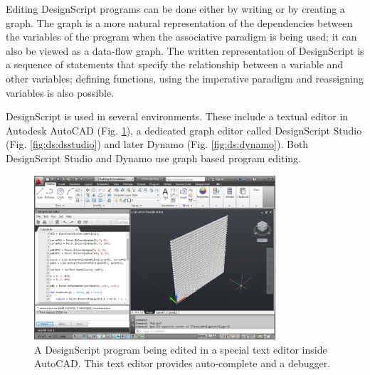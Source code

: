 \documentclass{./llncs2e/llncs}
\begin{document}
	Editing DesignScript programs can be done either by writing or by creating a graph. 
	The graph is a more natural representation of the dependencies between the variables of the program when the associative paradigm is being used; it can also be viewed as a data-flow graph. 
	The written representation of DesignScript is a sequence of statements that specify the relationship between a variable and other variables; defining functions, using the imperative paradigm and reassigning variables is also possible.
	
	DesignScript is used in several environments. 
	These include a textual editor in Autodesk AutoCAD (Fig. \ref{fig:ds:autocad}), a dedicated graph editor called DesignScript Studio (Fig. \ref{fig:ds:dsstudio}) and later Dynamo (Fig. \ref{fig:ds:dynamo}). 
	Both DesignScript Studio and Dynamo use graph based program editing.
	
	\begin{figure}
		\centering
		\includegraphics[width=0.8\textwidth]{img/ds_autocad}
		\caption{A DesignScript program being edited in a special text editor inside AutoCAD. This text editor provides auto-complete and a debugger.}
		\label{fig:ds:autocad}
	\end{figure} 
	
\end{document}

